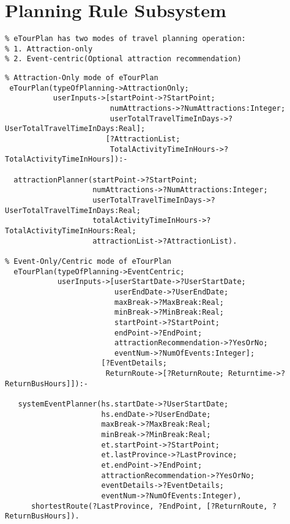 \section*{Planning Rule Subsystem}   
\singlespacing
\begin{verbatim}
% eTourPlan has two modes of travel planning operation:
% 1. Attraction-only
% 2. Event-centric(Optional attraction recommendation)
\end{verbatim}
\vspace{-0.25in}
\footnotesize
\begin{verbatim}
% Attraction-Only mode of eTourPlan
 eTourPlan(typeOfPlanning->AttractionOnly;
           userInputs->[startPoint->?StartPoint;
                        numAttractions->?NumAttractions:Integer;
                        userTotalTravelTimeInDays->?UserTotalTravelTimeInDays:Real];
                       [?AttractionList; 
                        TotalActivityTimeInHours->?TotalActivityTimeInHours]):-
						  
  attractionPlanner(startPoint->?StartPoint; 
                    numAttractions->?NumAttractions:Integer; 
                    userTotalTravelTimeInDays->?UserTotalTravelTimeInDays:Real; 
                    totalActivityTimeInHours->?TotalActivityTimeInHours:Real; 
                    attractionList->?AttractionList).  
												
% Event-Only/Centric mode of eTourPlan
  eTourPlan(typeOfPlanning->EventCentric;
            userInputs->[userStartDate->?UserStartDate;  
                         userEndDate->?UserEndDate;  
                         maxBreak->?MaxBreak:Real; 
                         minBreak->?MinBreak:Real;
                         startPoint->?StartPoint;
                         endPoint->?EndPoint;
                         attractionRecommendation->?YesOrNo;
                         eventNum->?NumOfEvents:Integer];
                      [?EventDetails;
                       ReturnRoute->[?ReturnRoute; Returntime->?ReturnBusHours]]):-

   systemEventPlanner(hs.startDate->?UserStartDate;  
                      hs.endDate->?UserEndDate;  
                      maxBreak->?MaxBreak:Real; 
                      minBreak->?MinBreak:Real;
                      et.startPoint->?StartPoint;
                      et.lastProvince->?LastProvince;
                      et.endPoint->?EndPoint;
                      attractionRecommendation->?YesOrNo;           
                      eventDetails->?EventDetails;
                      eventNum->?NumOfEvents:Integer),
      shortestRoute(?LastProvince, ?EndPoint, [?ReturnRoute, ?ReturnBusHours]).


\end{verbatim}
